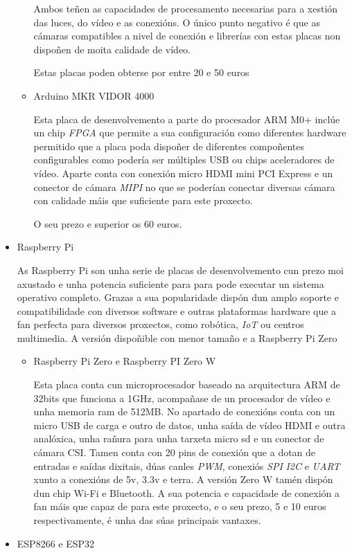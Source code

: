 \begin{itemize}
\begin{itemize}
Ambos teñen as capacidades de procesamento necesarias para a xestión das luces, do vídeo e as conexións. O único punto negativo é que as cámaras compatibles a nivel de conexión e librerías con estas placas non dispoñen de moita calidade de vídeo.

Estas placas poden obterse por entre 20 e 50 euros

        \item Arduino MKR VIDOR 4000

Esta placa de desenvolvemento a parte do procesador ARM M0+ inclúe un chip \emph{FPGA} que permite a sua configuración como diferentes hardware permitido que a placa poda dispoñer de diferentes compoñentes configurables como podería ser múltiples USB ou chips aceleradores de vídeo. Aparte conta con conexión micro HDMI mini PCI Express e un conector de cámara \emph{MIPI} no que se poderían conectar diversas cámara con calidade máis que suficiente para este proxecto.

O seu prezo e superior os 60 euros.
    \end{itemize}
    \item Raspberry Pi

As Raspberry Pi son unha serie de placas de desenvolvemento cun prezo moi axustado e unha potencia suficiente para para pode executar un sistema operativo completo. Grazas a sua popularidade dispón dun amplo soporte e compatibilidade con diversos software e outras plataformas hardware que a fan perfecta para diversos proxectos, como robótica, \emph{IoT} ou centros multimedia.
A versión dispoñible con menor tamaño e a Raspberry Pi Zero
    \begin{itemize}
        \item Raspberry Pi Zero e Raspberry PI Zero W

Esta placa conta cun microprocesador baseado na arquitectura ARM de 32bits que funciona a 1GHz, acompañase de un procesador de vídeo e unha memoria ram de 512MB. No apartado de conexións conta con un micro USB de carga e outro de datos, unha saída de vídeo HDMI e outra analóxica, unha rañura para unha tarxeta micro sd e un conector de cámara CSI. Tamen conta con 20 pins de conexión que a dotan de entradas e saídas dixitais, dúas canles \emph{PWM}, conexiós \emph{SPI} \emph{I2C} e \emph{UART} xunto a conexións de 5v, 3.3v e terra. A versión Zero W tamén dispón dun chip Wi-Fi e Bluetooth.
A sua potencia e capacidade de conexión a fan máis que capaz de para este proxecto, e o seu prezo, 5 e 10 euros respectivamente, é unha das súas principais vantaxes.
    \end{itemize}
    \item ESP8266 e ESP32


\end{itemize}
